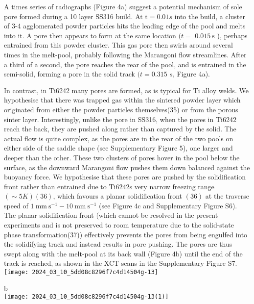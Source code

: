 \documentclass[10pt]{article}
\begin{document}
A times series of radiographs (Figure 4a) suggest a potential mechanism of sole pore formed during a 10 layer SS316 build. At $\mathrm{t}=0.01 s$ into the build, a cluster of 3-4 agglomerated powder particles hits the leading edge of the pool and melts into it. A pore then appears to form at the same location $(t=$ $0.015 \mathrm{~s}$ ), perhaps entrained from this powder cluster. This gas pore then swirls around several times in the melt-pool, probably following the Marangoni flow streamlines. After a third of a second, the pore reaches the rear of the pool, and is entrained in the semi-solid, forming a pore in the solid track $(t=0.315$ $s$, Figure 4a).

In contrast, in Ti6242 many pores are formed, as is typical for Ti alloy welds. We hypothesise that there was trapped gas within the sintered powder layer which originated from either the powder particles themselves(35) or from the porous sinter layer. Interestingly, unlike the pore in SS316, when the pores in Ti6242 reach the back, they are pushed along rather than captured by the solid. The actual flow is quite complex, as the pores are in the rear of the two pools on either side of the saddle shape (see Supplementary Figure 5), one larger and deeper than the other. These two clusters of pores hover in the pool below the surface, as the downward Marangoni flow pushes them down balanced against the buoyancy force. We hypothesise that these pores are pushed by the solidification front rather than entrained due to Ti6242s very narrow freezing range $(\sim 5 K)(36)$, which favours a planar solidification front $(36)$ at the traverse speed of $1 \mathrm{~mm} \mathrm{~s}^{-1}-10 \mathrm{~mm} \mathrm{~s}^{-1}$ (see Figure 4c and Supplementary Figure S6). The planar solidification front (which cannot be resolved in the present experiments and is not preserved to room temperature due to the solid-state phase transformation(37)) effectively prevents the pores from being engulfed into the solidifying track and instead results in pore pushing. The pores are thus swept along with the melt-pool at its back wall (Figure 4b) until the end of the track is reached, as shown in the XCT scans in the Supplementary Figure S7.\\
\texttt{[image: 2024\_03\_10\_5dd08c8296f7c4d14504g-13]}

b\\
\texttt{[image: 2024\_03\_10\_5dd08c8296f7c4d14504g-13(1)]}
\end{document}
